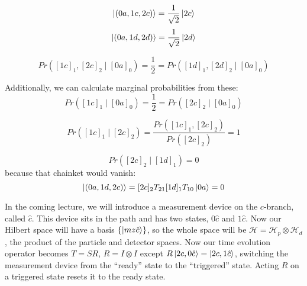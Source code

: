 \documentclass[a4paper,twoside,master.tex]{subfiles}
\begin{document}
\begin{equation}
    \ket{(0a,1c,2c)} = \frac{1}{\sqrt{2} }\ket{2c}
\end{equation}
\begin{equation}
    \ket{(0a,1d,2d)} = \frac{1}{\sqrt{2}}\ket{2d}
\end{equation}

\begin{equation}
    Pr([1c]_1,[2c]_2 \mid [0a]_0) = \frac{1}{2} = Pr([1d]_1,[2d]_2 \mid [0a]_0)
\end{equation}

Additionally, we can calculate marginal probabilities from these:
\begin{equation}
    Pr([1c]_1 \mid [0a]_0) = \frac{1}{2} = Pr([2c]_2 \mid [0a]_0)
\end{equation}

\begin{equation}
    Pr([1c]_1\mid [2c]_2) = \frac{Pr([1c]_1,[2c]_2)}{Pr([2c]_2)} = 1
\end{equation}

\begin{equation}
    Pr([2c]_2\mid[1d]_1) = 0
\end{equation}
because that chainket would vanish:
\begin{equation}
    \ket{(0a,1d,2c)} =[2c]_2T_{21}[1d]_1T_{10}\ket{0a} = 0
\end{equation}

In the coming lecture, we will introduce a measurement device on the $c$-branch, called $ \hat{c}$. This device sits in the path and has two states, $0\hat{c}$ and $1\hat{c}$. Now our Hilbert space will have a basis $\{\ket{mz \hat{c}}\} $, so the whole space will be $\mathcal{H} = \mathcal{H}_p \otimes \mathcal{H}_d$, the product of the particle and detector spaces. Now our time evolution operator becomes $T = SR$, $R=I\otimes I$ except $R\ket{2c, 0\hat{c}} = \ket{2c,1\hat{c}}$, switching the measurement device from the ``ready'' state to the ``triggered'' state. Acting $R$ on a triggered state resets it to the ready state.
\end{document}
